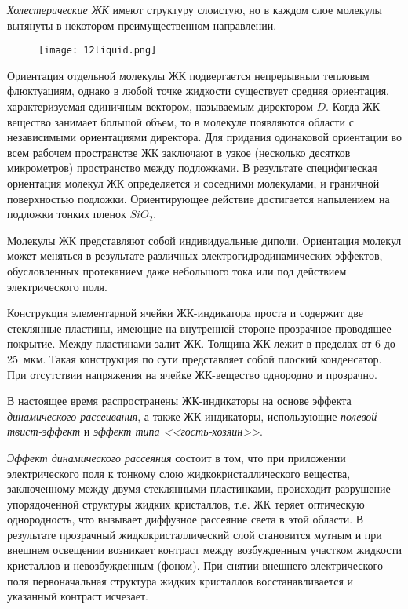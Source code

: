 \textit{Холестерические ЖК} имеют структуру слоистую, но в каждом слое молекулы вытянуты в некотором преимущественном направлении.

\begin{figure}[h!]
	\texttt{[image: 12liquid.png]}
	\label{pic:12liquid}
\end{figure}

Ориентация отдельной молекулы ЖК подвергается непрерывным тепловым флюктуациям, однако в любой точке жидкости существует средняя ориентация, характеризуемая единичным вектором, называемым директором $ D $. Когда ЖК-вещество занимает большой объем, то в молекуле появляются области с независимыми ориентациями директора. Для придания одинаковой ориентации во всем рабочем пространстве ЖК заключают в узкое (несколько десятков микрометров) пространство между подложками. В результате специфическая ориентация молекул ЖК определяется и соседними молекулами, и граничной поверхностью подложки. Ориентирующее действие достигается напылением на подложки тонких пленок $ SiO_2 $.

Молекулы ЖК представляют собой индивидуальные диполи. Ориентация молекул может меняться в результате различных электрогидродинамических эффектов, обусловленных протеканием даже небольшого тока или под действием электрического поля.

Конструкция элементарной ячейки ЖК-индикатора проста и содержит две стеклянные пластины, имеющие на внутренней стороне прозрачное проводящее покрытие. Между пластинами залит ЖК. Толщина ЖК лежит в пределах от 6 до 25~мкм. Такая конструкция по сути представляет собой плоский конденсатор. При отсутствии напряжения на ячейке ЖК-вещество однородно и прозрачно.

В настоящее время распространены ЖК-индикаторы на основе эффекта \textit{динамического рассеивания}, а также ЖК-индикаторы, использующие \textit{полевой твист-эффект} и \textit{эффект типа <<гость-хозяин>>}.

\textit{Эффект динамического рассеяния} состоит в том, что при приложении электрического поля к тонкому слою жидкокристаллического вещества, заключенному между двумя стеклянными пластинками, происходит разрушение упорядоченной структуры жидких кристаллов, т.е. ЖК теряет оптическую однородность, что вызывает диффузное рассеяние света в этой области. В результате прозрачный жидкокристаллический слой становится мутным и при внешнем освещении возникает контраст между возбужденным участком жидкости кристаллов и невозбужденным (фоном). При снятии внешнего электрического поля первоначальная структура жидких кристаллов восстанавливается и указанный контраст исчезает.

